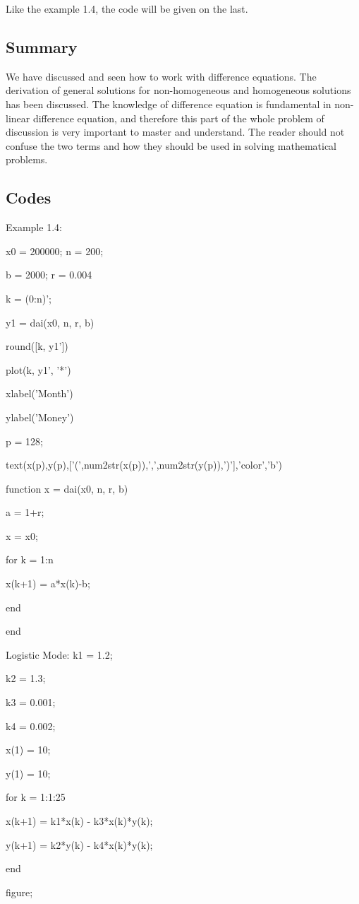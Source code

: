 \documentclass[12pt]{article}
\begin{document}
Like the example 1.4, the code will be given on the last.
\subsection{Summary}

We have discussed and seen how to work with difference equations. The derivation of general solutions for non-homogeneous and homogeneous solutions has been discussed. The knowledge of difference equation is fundamental in non-linear difference equation, and therefore this part of the whole problem of discussion is very important to master and understand. The reader should not confuse the two terms and how they should be used in solving mathematical problems. 
\subsection{Codes}
Example 1.4:

x0 = 200000; n = 200;

b = 2000; r = 0.004

k = (0:n)';

y1 = dai(x0, n, r, b)

round([k, y1'])

plot(k, y1', '*')

xlabel('Month')

ylabel('Money')

p = 128;

text(x(p),y(p),['(',num2str(x(p)),',',num2str(y(p)),')'],'color','b')

function x = dai(x0, n, r, b)

a = 1+r;

x = x0;

for k = 1:n

    x(k+1) = a*x(k)-b;

end

end

Logistic Mode:
k1 = 1.2;

k2 = 1.3;

k3 = 0.001;

k4 = 0.002;

x(1) = 10;

y(1) = 10;

for k = 1:1:25

    x(k+1) = k1*x(k) - k3*x(k)*y(k);

    y(k+1) = k2*y(k) - k4*x(k)*y(k);

end

figure;
\end{document}
